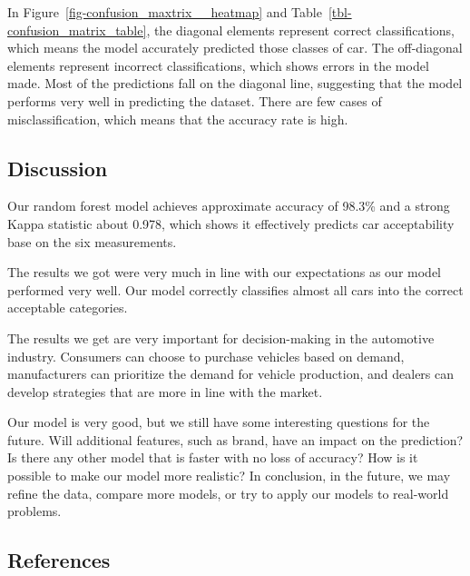 \documentclass[
  letterpaper,
  DIV=11,
  numbers=noendperiod]{scrartcl}
\begin{document}
In Figure~\ref{fig-confusion_maxtrix__heatmap} and
Table~\ref{tbl-confusion_matrix_table}, the diagonal elements represent
correct classifications, which means the model accurately predicted
those classes of car. The off-diagonal elements represent incorrect
classifications, which shows errors in the model made. Most of the
predictions fall on the diagonal line, suggesting that the model
performs very well in predicting the dataset. There are few cases of
misclassification, which means that the accuracy rate is high.

\subsection{Discussion}\label{discussion}

Our random forest model achieves approximate accuracy of 98.3\% and a
strong Kappa statistic about 0.978, which shows it effectively predicts
car acceptability base on the six measurements.

The results we got were very much in line with our expectations as our
model performed very well. Our model correctly classifies almost all
cars into the correct acceptable categories.

The results we get are very important for decision-making in the
automotive industry. Consumers can choose to purchase vehicles based on
demand, manufacturers can prioritize the demand for vehicle production,
and dealers can develop strategies that are more in line with the
market.

Our model is very good, but we still have some interesting questions for
the future. Will additional features, such as brand, have an impact on
the prediction? Is there any other model that is faster with no loss of
accuracy? How is it possible to make our model more realistic? In
conclusion, in the future, we may refine the data, compare more models,
or try to apply our models to real-world problems.

\subsection*{References}\label{references}
\end{document}

